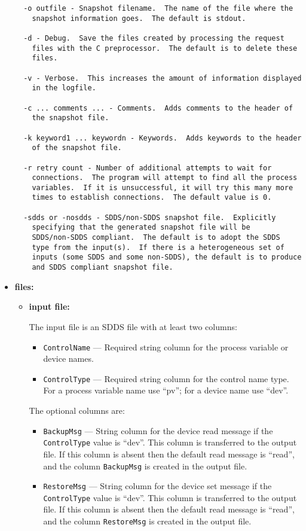 \begin{itemize}
\begin{verbatim}
  -o outfile - Snapshot filename.  The name of the file where the
  	snapshot information goes.  The default is stdout.

  -d - Debug.  Save the files created by processing the request
  	files with the C preprocessor.  The default is to delete these
  	files.

  -v - Verbose.  This increases the amount of information displayed
  	in the logfile.

  -c ... comments ... - Comments.  Adds comments to the header of
  	the snapshot file.

  -k keyword1 ... keywordn - Keywords.  Adds keywords to the header
  	of the snapshot file.

  -r retry count - Number of additional attempts to wait for
  	connections.  The program will attempt to find all the process
  	variables.  If it is unsuccessful, it will try this many more
  	times to establish connections.  The default value is 0.

  -sdds or -nosdds - SDDS/non-SDDS snapshot file.  Explicitly
  	specifying that the generated snapshot file will be 
  	SDDS/non-SDDS compliant.  The default is to adopt the SDDS
  	type from the input(s).  If there is a heterogeneous set of
  	inputs (some SDDS and some non-SDDS), the default is to produce
  	and SDDS compliant snapshot file.

\end{verbatim}
\item {\bf files:}
\begin{itemize}
\item {\bf input file:} \par
The input file is an SDDS file with at least two columns:
\begin{itemize}
        \item {\tt ControlName} --- Required string column for the process variable or device names.
        \item {\tt ControlType} --- Required string column for the control name type. For a 
                process variable name use ``pv''; for a device name use ``dev''.
\end{itemize}
The optional columns are:
\begin{itemize}
        \item {\tt BackupMsg} --- String column for the device read message if the {\tt ControlType} value is ``dev''. 
                This column is transferred to the output file. 
                If this column is absent then the default read message is ``read'', and the column {\tt BackupMsg} is created in the output file.
        \item {\tt RestoreMsg} --- String column for the device set message if the {\tt ControlType} value is ``dev''.
                This column is transferred to the output file. 
                If this column is absent then the default read message is ``read'', and the column {\tt RestoreMsg} is created in the output file.
\end{itemize}


\end{itemize}
\end{itemize}
